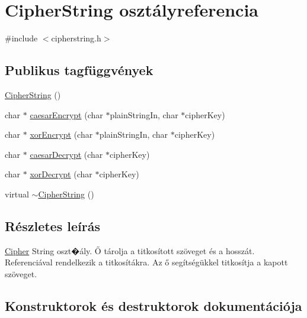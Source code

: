 \hypertarget{class_cipher_string}{}\section{Cipher\+String osztályreferencia}
\label{class_cipher_string}


{\ttfamily \#include $<$cipherstring.\+h$>$}

\subsection*{Publikus tagfüggvények}
\begin{DoxyCompactItemize}
\item 
\hyperlink{class_cipher_string_a78d5c6bcc232f0c2cde34d5706107127}{Cipher\+String} ()
\item 
char $\ast$ \hyperlink{class_cipher_string_ad697651cb43128c9f980a00f2fd31c69}{caesar\+Encrypt} (char $\ast$plain\+String\+In, char $\ast$cipher\+Key)
\item 
char $\ast$ \hyperlink{class_cipher_string_abb9c46f5902c8d3cf58f1adbbe571e58}{xor\+Encrypt} (char $\ast$plain\+String\+In, char $\ast$cipher\+Key)
\item 
char $\ast$ \hyperlink{class_cipher_string_a06310ff798cab137ae7faa769fc512d8}{caesar\+Decrypt} (char $\ast$cipher\+Key)
\item 
char $\ast$ \hyperlink{class_cipher_string_a9d8689809d1e4e77867466e56335977d}{xor\+Decrypt} (char $\ast$cipher\+Key)
\item 
virtual \hyperlink{class_cipher_string_a805b365286a97e096db9c04b555f3ef9}{$\sim$\+Cipher\+String} ()
\end{DoxyCompactItemize}


\subsection{Részletes leírás}
\hyperlink{class_cipher}{Cipher} String oszt�ály. Ő tárolja a titkosított szöveget és a hosszát. Referenciával rendelkezik a titkosítákra. Az ő segítségükkel titkosítja a kapott szöveget. 

\subsection{Konstruktorok és destruktorok dokumentációja}
\mbox{\label{class_cipher_string_a78d5c6bcc232f0c2cde34d5706107127}} 
